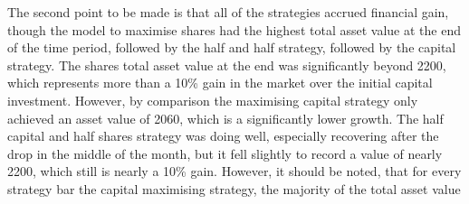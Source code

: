 The second point to be made is that all of the strategies accrued financial gain, though the model to maximise shares had the highest total asset value at the end of the time period, followed by the half and half strategy, followed by the capital strategy. The shares total asset value at the end was significantly beyond 2200, which represents more than a 10\% gain in the market over the initial capital investment. However, by comparison the maximising capital strategy only achieved an asset value of 2060, which is a significantly lower growth. The half capital and half shares strategy was doing well, especially recovering after the drop in the middle of the month, but it fell slightly to record a value of nearly 2200, which still is nearly a 10\% gain. However, it should be noted, that for every strategy bar the capital maximising strategy, the majority of the total asset value 

